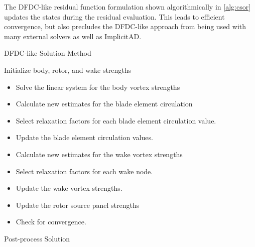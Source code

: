 
The DFDC-like residual function formulation shown algorithmically in \cref{alg:csor} updates the states during the residual evaluation.
%
This leads to efficient convergence, but also precludes the DFDC-like approach from being used with many external solvers as well as ImplicitAD.

\begin{algorithm}
\caption{DFDC-like Solution Method}\label{alg:csor}
\begin{algorithmic}
\State Initialize body, rotor, and wake strengths
\begin{itemize}
    \renewcommand\labelitemi{\(\cdot\)}
    \setlength{\itemindent}{1em}
    \item Solve the linear system for the body vortex strengths %
    \item Calculate new estimates for the blade element circulation %
    \item Select relaxation factors for each blade element circulation value. %
    \item Update the blade element circulation values. %
    \item Calculate new estimates for the wake vortex strengths %
    \item Select relaxation factors for each wake node. %
    \item Update the wake vortex strengths. %
    \item Update the rotor source panel strengths %
    \item Check for convergence. %
\end{itemize}
\EndWhile
\State Post-process Solution
\end{algorithmic}
\end{algorithm}


